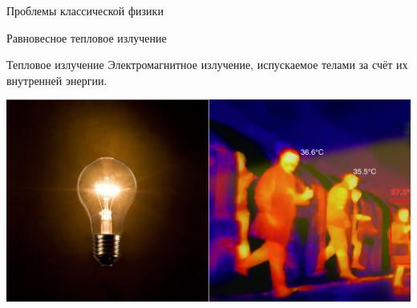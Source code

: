 \documentclass[12]{beamer}
\begin{document}
\begin{frame}[t]{Проблемы классической физики}
{}
\end{frame}

\begin{frame}[t]{Равновесное тепловое излучение}
\begin{block}{Тепловое излучение}
Электромагнитное излучение, испускаемое телами за счёт их внутренней энергии. 
\end{block}
\includegraphics[width=\textwidth]{Seminar_01/pics/pic_01.png}
\end{frame}
\end{document}
